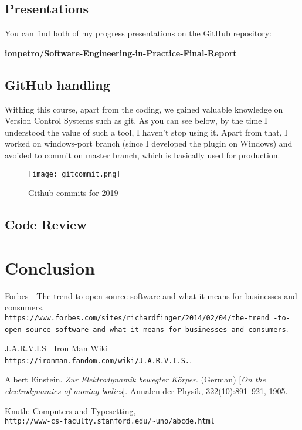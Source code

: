 \documentclass[12pt]{article}
\begin{document}
  \subsection{Presentations}
  
  You can find both of my progress presentations on the GitHub repository: \\
  
  \centerline{
  \textbf{ionpetro/Software-Engineering-in-Practice-Final-Report}
  }
  
  \subsection{GitHub handling}
  
  Withing this course, apart from the coding, we gained valuable knowledge on Version Control Systems such as git. As you can see below, by the time I understood the value of such a tool, I haven't stop using it. Apart from that, I worked on windows-port branch (since I developed the plugin on Windows) and avoided to commit on master branch, which is basically used for production.
  
\begin{figure}[h]
\centerline{\texttt{[image: gitcommit.png]}}
  \caption{Github commits for 2019}
  \label{fig:verticalcell}
\end{figure}

  
  
  \subsection{Code Review}
  
\section{Conclusion}
  
  
\begin{thebibliography}{9}

Forbes - The trend to open source software and what it means for businesses and consumers.
\\\texttt{https://www.forbes.com/sites/richardfinger/2014/02/04/the-trend
-to-open-source-software-and-what-it-means-for-businesses-and-consumers}.

J.A.R.V.I.S | Iron Man Wiki
\\\texttt{https://ironman.fandom.com/wiki/J.A.R.V.I.S.}.

Albert Einstein. 
\textit{Zur Elektrodynamik bewegter K{\"o}rper}. (German) 
[\textit{On the electrodynamics of moving bodies}]. 
Annalen der Physik, 322(10):891–921, 1905.
 
Knuth: Computers and Typesetting,
\\\texttt{http://www-cs-faculty.stanford.edu/\~{}uno/abcde.html}
\end{thebibliography}
  
\end{document}
